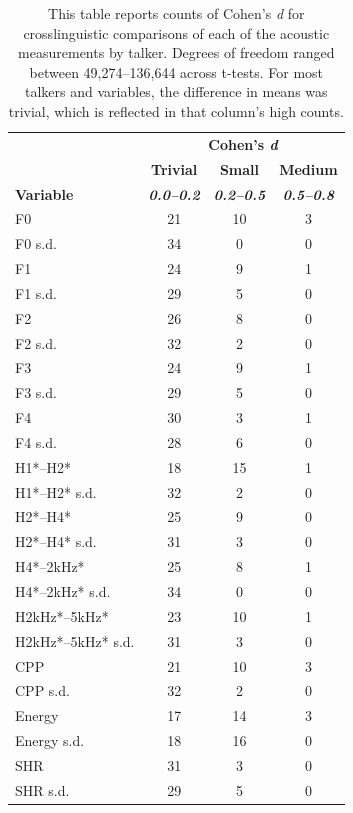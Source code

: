 \begin{table}[htbp]
\caption{This table reports counts of Cohen's \textit{d} for crosslinguistic comparisons of each of the acoustic measurements by talker. Degrees of freedom ranged between 49,274--136,644 across t-tests. For most talkers and variables, the difference in means was trivial, which is reflected in that column's high counts.}
\label{ch3:tab:cohend}
\centering
\begin{tabular}{lccc}
\toprule
         & \multicolumn{3}{c}{\textbf{Cohen's \textit{d}}} \\
         & \textbf{Trivial} & \textbf{Small} & \textbf{Medium} \\
\textbf{Variable} & \textbf{\textit{0.0--0.2}} & \textbf{\textit{0.2--0.5}} & \textbf{\textit{0.5--0.8}} \\ 
\midrule
F0 & 21 & 10 & 3 \\
F0 s.d. & 34 & 0 & 0 \\
F1 & 24 & 9 & 1 \\
F1 s.d. & 29 & 5 & 0 \\
F2 & 26 & 8 & 0 \\
F2 s.d. & 32 & 2 & 0 \\
F3 & 24 & 9 & 1 \\
F3 s.d. & 29 & 5 & 0 \\
F4 & 30 & 3 & 1 \\
F4 s.d. & 28 & 6 & 0 \\
H1*--H2* & 18 & 15 & 1 \\
H1*--H2* s.d. & 32 & 2 & 0 \\
H2*--H4* & 25 & 9 & 0 \\
H2*--H4* s.d. & 31 & 3 & 0 \\
H4*--2kHz* & 25 & 8 & 1 \\
H4*--2kHz* s.d. & 34 & 0 & 0 \\
H2kHz*--5kHz* & 23 & 10 & 1 \\
H2kHz*--5kHz* s.d. & 31 & 3 & 0 \\
CPP & 21 & 10 & 3 \\
CPP s.d. & 32 & 2 & 0 \\
Energy & 17 & 14 & 3 \\
Energy s.d. & 18 & 16 & 0 \\
SHR & 31 & 3 & 0 \\
SHR s.d. & 29 & 5 & 0 \\
\bottomrule
\end{tabular}
\end{table}

